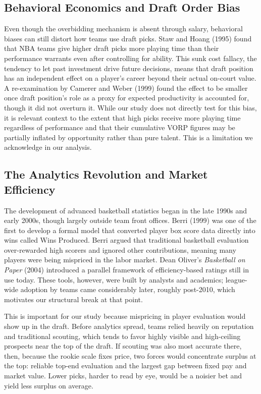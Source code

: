 \documentclass[12pt,letterpaper]{article}
\begin{document}
\subsection{Behavioral Economics and Draft Order Bias}

Even though the overbidding mechanism is absent through salary, behavioral biases can still distort how teams use draft picks. Staw and Hoang (1995) found that NBA teams give higher draft picks more playing time than their performance warrants even after controlling for ability. This sunk cost fallacy, the tendency to let past investment drive future decisions, means that draft position has an independent effect on a player's career beyond their actual on-court value. A re-examination by Camerer and Weber (1999) found the effect to be smaller once draft position's role as a proxy for expected productivity is accounted for, though it did not overturn it. While our study does not directly test for this bias, it is relevant context to the extent that high picks receive more playing time regardless of performance and that their cumulative VORP figures may be partially inflated by opportunity rather than pure talent. This is a limitation we acknowledge in our analysis.


\subsection{The Analytics Revolution and Market Efficiency}

The development of advanced basketball statistics began in the late 1990s and early 2000s, though largely outside team front offices. Berri (1999) was one of the first to develop a formal model that converted player box score data directly into wins called Wins Produced. Berri argued that traditional basketball evaluation over-rewarded high scorers and ignored other contributions, meaning many players were being mispriced in the labor market. Dean Oliver's \emph{Basketball on Paper} (2004) introduced a parallel framework of efficiency-based ratings still in use today. These tools, however, were built by analysts and academics; league-wide adoption by teams came considerably later, roughly post-2010, which motivates our structural break at that point.

This is important for our study because mispricing in player evaluation would show up in the draft. Before analytics spread, teams relied heavily on reputation and traditional scouting, which tends to favor highly visible and high-ceiling prospects near the top of the draft. If scouting was also most accurate there, then, because the rookie scale fixes price, two forces would concentrate surplus at the top: reliable top-end evaluation and the largest gap between fixed pay and market value. Lower picks, harder to read by eye, would be a noisier bet and yield less surplus on average.
\end{document}
